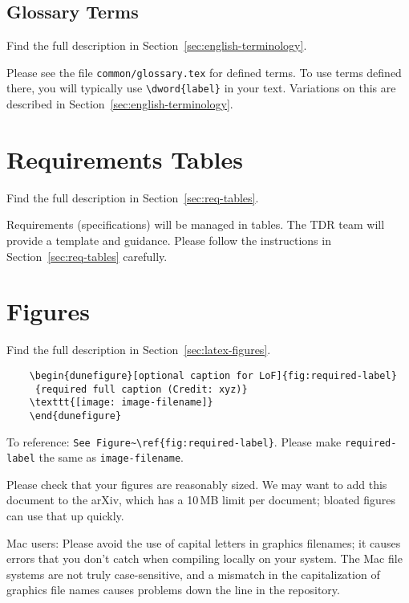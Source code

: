 \subsection{Glossary Terms}
\begin{framed}
Find the full description in Section~\ref{sec:english-terminology}.

Please see the file \verb|common/glossary.tex| for defined terms. To use terms defined there, you will typically use \verb|\dword{label}| in your text.  Variations on this are described in Section~\ref{sec:english-terminology}.
\end{framed}

\section{Requirements Tables}
\begin{framed}
Find the full description in Section~\ref{sec:req-tables}.

Requirements (specifications) will be managed in tables. The TDR team will provide a template and guidance.  Please follow the instructions in 
Section~\ref{sec:req-tables} carefully. 
\end{framed}

\section{Figures}
\begin{framed}
Find the full description in Section~\ref{sec:latex-figures}.
\begin{verbatim}
    \begin{dunefigure}[optional caption for LoF]{fig:required-label}
     {required full caption (Credit: xyz)}
    \texttt{[image: image-filename]}
    \end{dunefigure}
\end{verbatim}
To reference: \verb|See Figure~\ref{fig:required-label}|.
Please make \verb|required-label| the same as \verb|image-filename|. 

Please check that your figures are reasonably sized. We may want to add this document to the arXiv, which has a 10\,MB limit per document; bloated figures can use that up quickly. 

Mac users: Please avoid the use of capital letters in graphics filenames; it causes errors that you don't catch when compiling locally on your system. The Mac file systems are not truly case-sensitive, and a mismatch in the capitalization of graphics file names causes problems down the line in the repository.
\end{framed}

